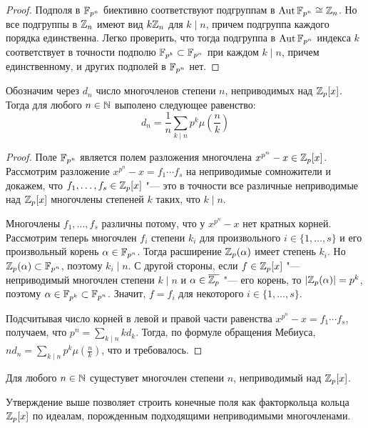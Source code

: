 \begin{proof}
	Подполя в $\mathbb{F}_{p^n}$ биективно соответствуют подгруппам в $\operatorname{Aut}\mathbb{F}_{p^n} \cong \mathbb{Z}_n$. Но все подгруппы в $\mathbb{Z}_n$ имеют вид $k\mathbb{Z}_n$ для $k \mid n$, причем подгруппа каждого порядка единственна. Легко проверить, что тогда подгруппа в $\operatorname{Aut}\mathbb{F}_{p^n}$ индекса $k$ соответствует в точности подполю $\mathbb{F}_{p^k} \subset \mathbb{F}_{p^n}$ при каждом $k \mid n$, причем единственному, и других подполей в $\mathbb{F}_{p^n}$ нет.
\end{proof}

\begin{theorem}
	Обозначим через $d_n$ число многочленов степени $n$, неприводимых над $\mathbb{Z}_p[x]$. Тогда для любого $n \in \mathbb{N}$ выполено следующее равенство:
	\[d_n = \frac1n\sum_{k \mid n}p^k\mu\left(\frac nk\right)\]
\end{theorem}

\begin{proof}
	Поле $\mathbb{F}_{p^n}$ является полем разложения многочлена $x^{p^n} - x \in \mathbb{Z}_p[x]$. Рассмотрим разложение $x^{p^n} - x = f_1\dotsb f_s$ на неприводимые сомножители и докажем, что $f_1, \dotsc, f_s \in \mathbb{Z}_p[x]$ "--- это в точности все различные неприводимые над $\mathbb{Z}_p[x]$ многочлены степеней $k$ таких, что $k \mid n$.
	
	Многочлены $f_1, \dotsc, f_s$ различны потому, что у $x^{p^n} - x$ нет кратных корней. Рассмотрим теперь многочлен $f_i$ степени $k_i$ для произвольного $i \in \{1, \dotsc, s\}$ и его произвольный корень $\alpha \in \mathbb{F}_{p^n}$. Тогда расширение $\mathbb{Z}_p(\alpha)$ имеет степень $k_i$. Но $\mathbb{Z}_p(\alpha) \subset \mathbb{F}_{p^n}$, поэтому $k_i \mid n$. С другой стороны, если $f \in \mathbb{Z}_p[x]$ "--- неприводимый многочлен степени $k \mid n$ и $\alpha \in \overline{\mathbb{Z}_p}$ "--- его корень, то $|\mathbb{Z}_p(\alpha)| = p^k$, поэтому $\alpha \in \mathbb{F}_{p^k} \subset \mathbb{F}_{p^n}$. Значит, $f = f_i$ для некоторого $i \in \{1, \dotsc, s\}$.
	
	Подсчитывая число корней в левой и правой части равенства $x^{p^n} - x = f_1\dotsb f_s$, получаем, что $p^n = \sum_{k \mid n}kd_k$. Тогда, по формуле обращения Мебиуса, $nd_n = \sum_{k \mid n}p^k\mu(\frac nk)$, что и требовалось.
\end{proof}

\begin{corollary}
	Для любого $n \in \mathbb{N}$ сущестувет многочлен степени $n$, неприводимый над $\mathbb{Z}_p[x]$.
\end{corollary}

\begin{note}
	Утверждение выше позволяет строить конечные поля как факторкольца кольца $\mathbb{Z}_p[x]$ по идеалам, порожденным подходящими неприводимыми многочленами.
\end{note}